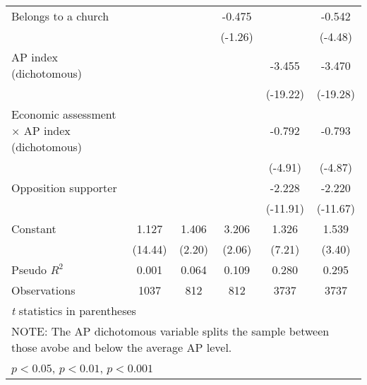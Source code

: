 {\begin{tabular}{l*{5}{c}}
Belongs to a church&                  &                  &   -0.475         &                  &   -0.542\sym{***}\\
                &                  &                  &  (-1.26)         &                  &  (-4.48)         \\
AP index (dichotomous)&                  &                  &                  &   -3.455\sym{***}&   -3.470\sym{***}\\
                &                  &                  &                  & (-19.22)         & (-19.28)         \\
Economic assessment $\times$ AP index (dichotomous)&                  &                  &                  &   -0.792\sym{***}&   -0.793\sym{***}\\
                &                  &                  &                  &  (-4.91)         &  (-4.87)         \\
Opposition supporter&                  &                  &                  &   -2.228\sym{***}&   -2.220\sym{***}\\
                &                  &                  &                  & (-11.91)         & (-11.67)         \\
Constant        &    1.127\sym{***}&    1.406\sym{*}  &    3.206\sym{*}  &    1.326\sym{***}&    1.539\sym{***}\\
                &  (14.44)         &   (2.20)         &   (2.06)         &   (7.21)         &   (3.40)         \\
\midrule
Pseudo \(R^{2}\)&    0.001         &    0.064         &    0.109         &    0.280         &    0.295         \\
Observations    &     1037         &      812         &      812         &     3737         &     3737         \\
\bottomrule
\multicolumn{6}{l}{\footnotesize \textit{t} statistics in parentheses}\\
\multicolumn{6}{l}{\footnotesize NOTE: The AP dichotomous variable splits the sample between those avobe and below the average AP level.}\\
\multicolumn{6}{l}{\footnotesize \sym{*} \(p<0.05\), \sym{**} \(p<0.01\), \sym{***} \(p<0.001\)}\\
\end{tabular}
}
